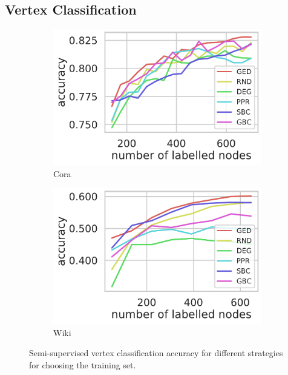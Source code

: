 \subsection{Vertex Classification}
\label{sec:ged-walk:vertex-class}
%
\begin{figure}[tb]

\hfill
\begin{subfigure}[t]{.45\textwidth}
\centering
\includegraphics[width=.8\textwidth]{./sources/plots/ged-walk/node_classification_cora_ml.pdf}
\caption{Cora}
\end{subfigure}\hfill
\begin{subfigure}[t]{.45\textwidth}
\centering
\includegraphics[width=.8\textwidth]{./sources/plots/ged-walk/node_classification_wiki.pdf}
\caption{Wiki}
\end{subfigure}\hfill

\caption{Semi-supervised vertex classification accuracy for different strategies
for choosing the training set.}
\label{fig:ged-walk:vertex-class}
\end{figure}

